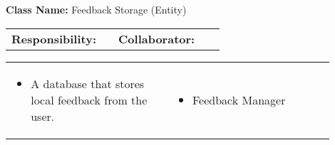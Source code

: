 \begin{red_cards}[]
    \textbf{Class Name:} Feedback Storage (Entity)
    \tcbline
    \begin{tabular}{p{0.45\linewidth} | p{0.45\linewidth}}
        \textbf{Responsibility:}& 
        \textbf{Collaborator:}\\
    \end{tabular}
    \tcbline
    \begin{tabular}{p{0.45\linewidth} | p{0.45\linewidth}}
        \begin{itemize}
            \item A database that stores local feedback from the user.
        \end{itemize}
        &
        \begin{itemize}
            \item Feedback Manager
        \end{itemize}
    \end{tabular}
\end{red_cards}